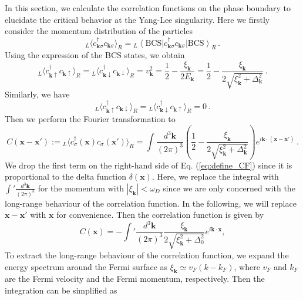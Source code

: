 \documentclass[aps,onecolumn,nofootinbib,superscriptaddress,notitlepage,longbibliography]{revtex4-1}
\begin{document}
In this section, we calculate the correlation functions on the phase boundary to elucidate the critical behavior at the Yang-Lee singularity. Here we firstly consider the momentum distribution of the particles
\begin{equation}
  {}_L\langle c_{\bm{k} \sigma}^{\dagger} c_{\bm{k} \sigma} \rangle_R = {}_L \left\langle
  \text{BCS} \right| c_{\bm{k} \sigma}^{\dagger} c_{\bm{k} \sigma} \left| \text{BCS}\right\rangle_R \,.
\end{equation}
Using the expression of the BCS states, we obtain
\begin{equation}
  {}_L\langle c_{\bm{k} \uparrow}^{\dagger} c_{\bm{k} \uparrow} \rangle_R = {}_L\langle c_{\bm{k}\downarrow}^{\dagger} c_{\bm{k} \downarrow} \rangle_R = v_{\bm{k}}^2 = \frac{1}{2} -
  \frac{\xi_{\bm{k}}}{2 E_{\bm{k}}} = \frac{1}{2} - \frac{\xi_{\bm{k}}}{2 \sqrt{\xi_{\bm{k}}^2 +
  \Delta_{\bm{k}}^2}}\,.
\end{equation}
Similarly, we have 
\begin{equation}
  {}_L\langle c_{\bm{k} \uparrow}^{\dagger} c_{\bm{k} \downarrow} \rangle_R = {}_L\langle c_{\bm{k}\downarrow}^{\dagger} c_{\bm{k} \uparrow} \rangle_R = 0\,.
\end{equation}
Then we perform the Fourier transformation to 
\begin{equation}
  C (\bm{x}-\bm{x}') := {}_L\langle c_{\sigma}^{\dagger} (\bm{x}) c_{\sigma} (\bm{x}') \rangle_R = \int \frac{d^3 \bm{k}}{(2 \pi)^3} \left(\frac{1}{2} - \frac{\xi_{\bm{k}}}{2 \sqrt{\xi_{\bm{k}}^2 + \Delta_{\bm{k}}^2}} \right)e^{i\bm{k} \cdot (\bm{x}-\bm{x}')}\,.
\label{eq:define_CF}
\end{equation}
We drop the first term on the right-hand side of Eq. (\ref{eq:define_CF}) since it is proportional to the delta function $\delta(\bm{x})$. Here, we replace the integral with $\int ' \frac{d^3 \bm{k}}{(2 \pi)^3}$ for the momentum with $|\xi_{\bm{k}}|<\omega_D$ since we are only concerned with the long-range behaviour of the correlation function. 
In the following, we will replace $\bm{x}-\bm{x}'$
with $\bm{x}$ for convenience. Then the correlation
function is given by
\begin{equation}
  C (\bm{x}) = -\int ' \frac{d^3 \bm{k}}{(2 \pi)^3} \frac{\xi_{\bm{k}}}{2 \sqrt{\xi_{\bm{k}}^2
  + \Delta_0^2}} e^{i\bm{k} \cdot \bm{x}},
\end{equation}
 To extract the long-range behaviour of the correlation function, we expand the energy spectrum around the Fermi surface as $\xi_{\bm{k}} \simeq v_F (k - k_F)$, where $v_F$ and $k_F$ are the Fermi velocity and the Fermi momentum, respectively. Then the integration can be simplified as
\end{document}
